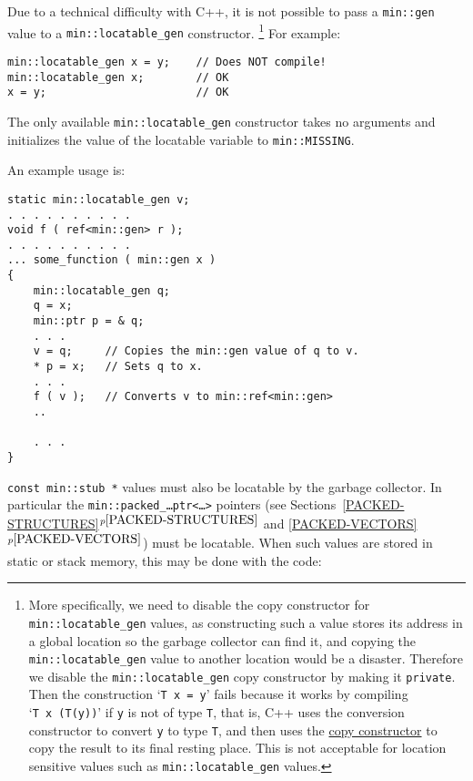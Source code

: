 \documentclass[12pt]{article}
\newcommand{\itemref}[1]{\ref{#1}$^{p\pageref{#1}}$}
\newcommand{\EOL}{\penalty \exhyphenpenalty}
\newcommand{\BRACKETED}[1]{{\tt <#1>}}
\newenvironment{indpar}[1][0.3in]%
	{\begin{list}{}%
		     {\setlength{\itemsep}{0in}%
		      \setlength{\topsep}{0in}%
		      \setlength{\parsep}{1ex}%
		      \setlength{\labelwidth}{#1}%
		      \setlength{\leftmargin}{#1}%
		      \addtolength{\leftmargin}{\labelsep}}%
	 \item}%
	{\end{list}}
\begin{document}
Due to a technical difficulty with C++, it is not possible to pass a
{\tt min::gen} value to a {\tt min::\EOL locatable\_\EOL gen} constructor.%
%
\footnote{\label{LOCATABLE-VAR-COPY-FOOTNOTE}
More specifically, we need to disable the copy constructor
for {\tt min::\EOL locatable\_\EOL gen} values, as constructing such a
value stores its address in a global location so the garbage collector
can find it, and copying the {\tt min::\EOL locatable\_\EOL gen} value
to another location would be a disaster.  Therefore we disable the
{\tt min::\EOL locatable\_\EOL gen}
copy constructor by making it {\tt private}.
Then the construction `{\tt T~x~=~y}' fails because it works
by compiling `{\tt T~x~(T(y))}' if {\tt y} is not of type {\tt T},
that is, C++ uses the conversion constructor to convert {\tt y}
to type {\tt T}, and then uses the \underline{copy constructor}
to copy the result to its final resting place.  This is not acceptable for
location sensitive values such as
{\tt min::\EOL locatable\_\EOL gen} values.}
%
For example:

\begin{indpar}\begin{verbatim}
min::locatable_gen x = y;    // Does NOT compile!
min::locatable_gen x;        // OK
x = y;                       // OK
\end{verbatim}\end{indpar}

The only available {\tt min::locatable\_gen} constructor takes
no arguments and initializes the value of the locatable variable
to {\tt min::\EOL MISSING}.

An example usage is:

\begin{indpar}\begin{verbatim}
static min::locatable_gen v;
. . . . . . . . . .
void f ( ref<min::gen> r );
. . . . . . . . . .
... some_function ( min::gen x )
{
    min::locatable_gen q;
    q = x;
    min::ptr p = & q;
    . . .
    v = q;     // Copies the min::gen value of q to v.
    * p = x;   // Sets q to x.
    . . .
    f ( v );   // Converts v to min::ref<min::gen>
    ..

    . . .
}
\end{verbatim}\end{indpar}

{\tt const min::\EOL stub~*} values
must also be locatable by the garbage collector.
In particular the {\tt min::\EOL packed\_\EOL \ldots ptr\BRACKETED{\ldots}}
pointers
(see Sections~\itemref{PACKED-STRUCTURES} and \itemref{PACKED-VECTORS})
must be locatable.
When such values are stored in static or stack memory,
this may be done with the code:
\end{document}
